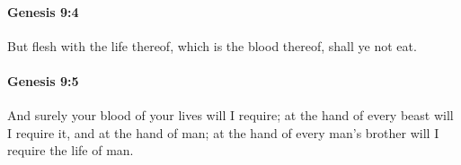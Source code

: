 		\paragraph{Genesis 9:4} %
			\label{GENESIS-9-4}

			But flesh with the life thereof, which is the blood thereof, shall ye not eat.


		\paragraph{Genesis 9:5} %
			\label{GENESIS-9-5}

			And surely your blood of your lives will I require; at the hand of every beast will I require it, and at the hand of man; at the hand of every man's brother will I require the life of man.


